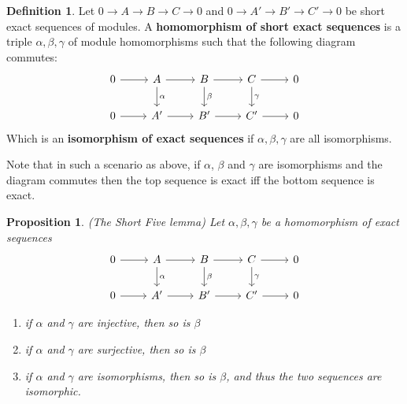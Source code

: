 \documentclass[12pt]{book}
\newtheorem{proposition}[theorem]{Proposition}
\theoremstyle{definition}
\newtheorem{definition}[theorem]{Definition}
\begin{document}
\begin{definition}
    Let $0 \rightarrow A \rightarrow B \rightarrow C  \rightarrow 0$ and $0 \rightarrow A' \rightarrow B' \rightarrow C'  \rightarrow 0$ be short exact sequences of modules. A \textbf{homomorphism of short exact sequences} is a triple $\alpha, \beta, \gamma$ of module homomorphisms such that the following diagram commutes: 
        \[
        \begin{tikzcd}
        0 \arrow[r] & A \arrow[r] \arrow[d, "\alpha"] 
        & B \arrow[r] \arrow[d, "\beta"] 
        & C \arrow[r] \arrow[d, "\gamma"] 
        & 0 \\
        0 \arrow[r] & A' \arrow[r] 
        & B' \arrow[r] 
        & C' \arrow[r] 
        & 0
        \end{tikzcd}
        \]
    Which is an \textbf{isomorphism of exact sequences} if $\alpha, \beta, \gamma$ are all isomorphisms. 
\end{definition}

Note that in such a scenario as above, if $\alpha$, $\beta$ and $\gamma$ are isomorphisms and the diagram commutes then the top sequence is exact iff the bottom sequence is exact. 

\begin{proposition}
    (The Short Five lemma) Let $\alpha, \beta, \gamma$ be a homomorphism of exact sequences
        \[
        \begin{tikzcd}
        0 \arrow[r] & A \arrow[r] \arrow[d, "\alpha"] 
        & B \arrow[r] \arrow[d, "\beta"] 
        & C \arrow[r] \arrow[d, "\gamma"] 
        & 0 \\
        0 \arrow[r] & A' \arrow[r] 
        & B' \arrow[r] 
        & C' \arrow[r] 
        & 0
        \end{tikzcd}
        \]
    \begin{enumerate}
        \item if $\alpha$ and $\gamma$ are injective, then so is $\beta$
        \item if $\alpha$ and $\gamma$ are surjective, then so is $\beta$
        \item if $\alpha$ and $\gamma$ are isomorphisms, then so is $\beta$, and thus the two sequences are isomorphic. 
    \end{enumerate}   
\end{proposition}
\end{document}
